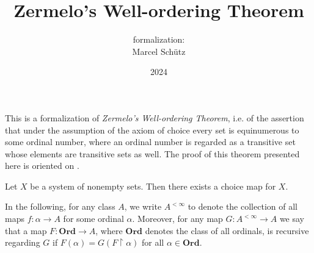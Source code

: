 \documentclass{article}
\title{Zermelo's Well-ordering Theorem}
\author{\Naproche formalization:\\[0.5em]Marcel Schütz}
\date{2024}
\newcommand\Ord{\textbf{Ord}}
\begin{document}
  \maketitle


  \noindent This is a formalization of \textit{Zermelo's Well-ordering Theorem},
  i.e. of the assertion that under the assumption of the axiom of choice every
  set is equinumerous to some ordinal number, where an ordinal number is
  regarded as a transitive set whose elements are transitive sets as well.
  The proof of this theorem presented here is oriented on \cite{Koepke2018}.

  \begin{forthel}
  \end{forthel}

  \begin{forthel}
    \begin{axiom*}[title=Axiom of Choice]
      Let $X$ be a system of nonempty sets.
      Then there exists a choice map for $X$.
    \end{axiom*}
  \end{forthel}

  \noindent In the following, for any class $A$, we write $A^{< \infty}$ to
  denote the collection of all maps $f : \alpha \to A$ for some ordinal
  $\alpha$.
  Moreover, for any map $G : A^{< \infty} \to A$ we say that a map $F : \Ord \to
  A$, where $\Ord$ denotes the class of all ordinals, is recursive regarding $G$
  if $F(\alpha) = G(F \restriction \alpha)$ for all $\alpha \in \Ord$.
\end{document}
